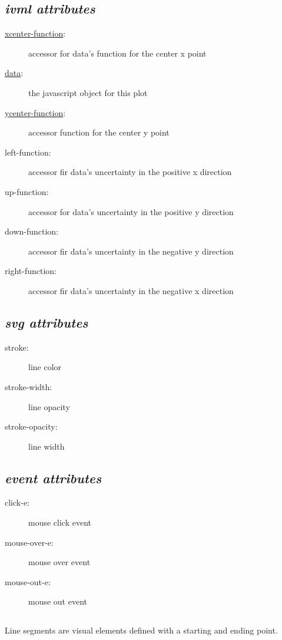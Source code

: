 \subsection*{\emph{ivml attributes}}
\begin{description}
\item[\uline{xcenter-function}:]{accessor for data's function for the center x point}
\item[\uline{data}:]{the javascript object for this plot}
\item[\uline{ycenter-function}:]{accessor function for the center y point}
\item[left-function:]{accessor fir data's uncertainty in the positive x direction}
\item[up-function:]{accessor for data's uncertainty in the positive y direction}
\item[down-function:]{accessor fir data's uncertainty in the negative y direction}
\item[right-function:]{accessor fir data's uncertainty in the negative x direction}
\end{description}
\subsection*{\emph{svg attributes}}
\begin{description}
\item[stroke:]{line color}
\item[stroke-width:]{line opacity}
\item[stroke-opacity:]{line width}
\end{description}
\subsection*{\emph{event attributes}}
\begin{description}
\item[click-e:]{mouse click event}
\item[mouse-over-e:]{mouse over event}
\item[mouse-out-e:]{mouse out event}
\end{description}
\clearpage \noindent \hrulefill
\subsection*{{\tt <line-segments>}}
\hrulefill\newline
 Line segments are visual elements defined with a starting and ending point.
